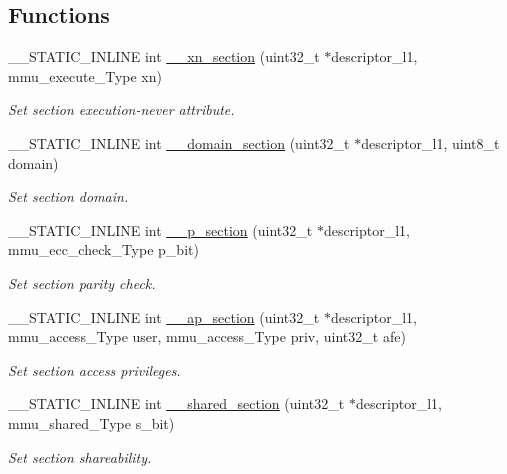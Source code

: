 \subsection*{Functions}
\begin{DoxyCompactItemize}
\item 
\+\_\+\+\_\+\+S\+T\+A\+T\+I\+C\+\_\+\+I\+N\+L\+I\+NE int \hyperlink{group___m_m_u___functions_gaac58bd6af8c207174df553059a28263e}{\+\_\+\+\_\+xn\+\_\+section} (uint32\+\_\+t $\ast$descriptor\+\_\+l1, mmu\+\_\+execute\+\_\+\+Type xn)
\begin{DoxyCompactList}\small\item\em Set section execution-\/never attribute. \end{DoxyCompactList}\item 
\+\_\+\+\_\+\+S\+T\+A\+T\+I\+C\+\_\+\+I\+N\+L\+I\+NE int \hyperlink{group___m_m_u___functions_gab9c5062b00045439b84362310c3bc5d0}{\+\_\+\+\_\+domain\+\_\+section} (uint32\+\_\+t $\ast$descriptor\+\_\+l1, uint8\+\_\+t domain)
\begin{DoxyCompactList}\small\item\em Set section domain. \end{DoxyCompactList}\item 
\+\_\+\+\_\+\+S\+T\+A\+T\+I\+C\+\_\+\+I\+N\+L\+I\+NE int \hyperlink{group___m_m_u___functions_ga47d76089fa83ddf1ad420f37c2787f8e}{\+\_\+\+\_\+p\+\_\+section} (uint32\+\_\+t $\ast$descriptor\+\_\+l1, mmu\+\_\+ecc\+\_\+check\+\_\+\+Type p\+\_\+bit)
\begin{DoxyCompactList}\small\item\em Set section parity check. \end{DoxyCompactList}\item 
\+\_\+\+\_\+\+S\+T\+A\+T\+I\+C\+\_\+\+I\+N\+L\+I\+NE int \hyperlink{group___m_m_u___functions_ga5f069f471adb154153051c570c3a6ab2}{\+\_\+\+\_\+ap\+\_\+section} (uint32\+\_\+t $\ast$descriptor\+\_\+l1, mmu\+\_\+access\+\_\+\+Type user, mmu\+\_\+access\+\_\+\+Type priv, uint32\+\_\+t afe)
\begin{DoxyCompactList}\small\item\em Set section access privileges. \end{DoxyCompactList}\item 
\+\_\+\+\_\+\+S\+T\+A\+T\+I\+C\+\_\+\+I\+N\+L\+I\+NE int \hyperlink{group___m_m_u___functions_ga9913b6ac45889fea12f9caa6292b89b3}{\+\_\+\+\_\+shared\+\_\+section} (uint32\+\_\+t $\ast$descriptor\+\_\+l1, mmu\+\_\+shared\+\_\+\+Type s\+\_\+bit)
\begin{DoxyCompactList}\small\item\em Set section shareability. \end{DoxyCompactList}\item 

\end{DoxyCompactItemize}
